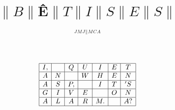 \documentclass[titlepage, 12pt]{article}
\title{{$\|B\|$\^E$\|T\|I\|S\|E\|S\|$}}
\author{${}^J{}^M{}^J{}^\| {}^M{}^C{}^A$}
\date{}                                      %
\begin{document}
\maketitle

\begin{equation*}\left.\begin{array}{|c|c|c|c|c|c|c|}\hline I, & {} & Q & U & I & E & T \\\hline A & N & {} & W & H & E & N \\\hline A & S & P, & {} & I & T & 'S \\\hline G & I & V & E & {} & O & N \\\hline A & L & A & R & M. & {} & A? \\\hline \end{array}\right.\end{equation*}
\end{document}

